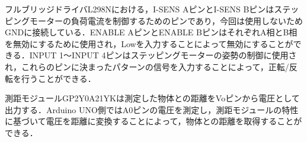 \documentclass{jsarticle}
\begin{document}
フルブリッジドライバL298Nにおける，I-SENS AピンとI-SENS Bピンはステッピングモーターの負荷電流を制御するためのピンであり，今回は使用しないためGNDに接続している．ENABLE AピンとENABLE BピンはそれぞれA相とB相を無効にするために使用され，Lowを入力することによって無効にすることができる．INPUT 1〜INPUT 4ピンはステッピングモーターの姿勢の制御に使用され，これらのピンに決まったパターンの信号を入力することによって，正転/反転を行うことができる．

測距モジュールGP2Y0A21YKは測定した物体との距離をVoピンから電圧として出力する．Arduino UNO側ではA0ピンの電圧を測定し，測距モジュールの特性に基づいて電圧を距離に変換することによって，物体との距離を取得することができる．
\end{document}
